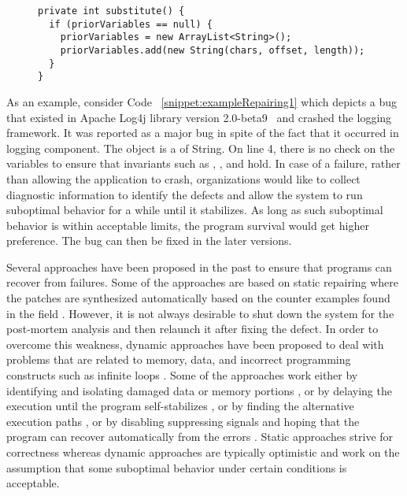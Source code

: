 \lstset{language=Java , caption=Apache Log4j bug example,
label=snippet:exampleRepairing1}
\begin{figure}[t]
\begin{lstlisting}
private int substitute() {
  if (priorVariables == null) {
    priorVariables = new ArrayList<String>();
    priorVariables.add(new String(chars, offset, length));
  }
}
\end{lstlisting}
\end{figure}

As an example, consider Code ~\ref{snippet:exampleRepairing1} which depicts a
bug that
existed in Apache Log4j library version 2.0-beta9~\cite{ApacheLog4jBug} and crashed
the logging framework. It was reported as a major bug in
spite of the fact that it occurred in logging component. The object
 is a  of String. On line 4, there is no check on the variables to ensure
that invariants such as , , and  hold. In case of a failure, rather than allowing the application to crash, organizations would
like to collect diagnostic information to identify the defects and allow the system to run suboptimal behavior
for a while until it stabilizes. As long as such suboptimal behavior is within acceptable
limits, the program survival would get higher preference. The bug can then be
fixed in the later versions.

Several approaches have been proposed in the past to ensure that programs can
recover from failures. Some of the approaches are based on static repairing
where the patches are synthesized automatically based on the counter examples
found in the field \cite{wei-issta-2010}.
However, it is not always desirable to shut down the system for the post-mortem analysis and then relaunch it
after fixing the defect. In order to overcome this weakness,
dynamic approaches have been proposed to deal with problems that are
related to memory, data, and incorrect programming constructs such as infinite
loops \cite{Carbin:2011, KlingMCR12, conf/sosp/PerkinsKLABCPSSSWZER09}. Some of the approaches work either by identifying and isolating
damaged data or memory portions \cite{conf/issre/DemskyR03, conf/icse/DemskyR05, conf/issta/DemskyEGMPR06}, or by delaying the execution until the program
self-stabilizes \cite{Eom:2012}, or by finding the alternative execution paths \cite{PezzeRWZ11}, or by disabling suppressing signals and hoping that the
program can recover automatically from the errors \cite{conf/pldi/LongSR14}. Static approaches strive
for correctness whereas dynamic approaches are typically optimistic and work on the
assumption that some suboptimal behavior under certain conditions is acceptable.

